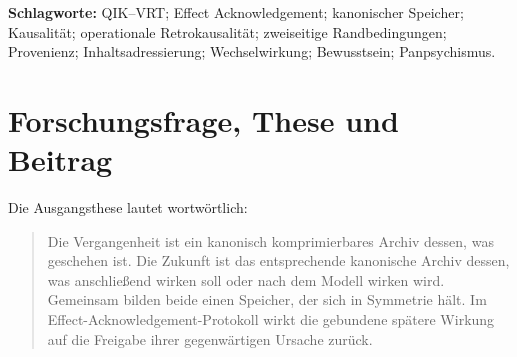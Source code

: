 \documentclass[11pt,a4paper]{article}
\theoremstyle{remark}
\begin{document}
\begin{otherlanguage}{english}
\begin{abstract}
This paper formalizes Ingolf Lohmann's thesis of a canonical memory that binds
past and future in a symmetric representational form.  The past is a
canonical, provenance-bearing archive of realized records; the future is a
canonical, provenance-bearing archive of anticipated or required later
effects.  Both use the same finite codec while retaining distinct epistemic
statuses: \emph{observed} and \emph{anticipated}.  QIK--VRT Effect
Acknowledgement joins them through a DONE-only release rule: a present cause
may become effective only if its future-indexed effect is explicitly bound,
validated, and acknowledged.

This is termed operational protocol retrocausality by the author in the
precisely defined protocol sense: a presently available representation of a
later effect is a non-eliminable, counterfactually relevant input to an earlier
release decision.  A Lean 4 model checks, as definitional and conformance
invariants, the necessary
past and future conditions, the counterfactual relevance of the future
boundary, non-overwrite of the past projection, and reciprocal closure between
a bound cause and an observed effect.  No physical signal from an already
actual future and no rewriting of a recorded past is inferred.  Provenance,
content addressing, forecasting, information thermodynamics, time-symmetric
quantum formalisms, and delayed-choice experiments are used as adjoining
theories with explicit limits.  A panpsychist reading is stated separately as
an ontological interpretation, not as an empirical consequence.
\end{abstract}
\end{otherlanguage}

\textbf{Schlagworte:} QIK--VRT; Effect Acknowledgement; kanonischer Speicher;
Kausalität; operationale Retrokausalität; zweiseitige Randbedingungen;
Provenienz; Inhaltsadressierung; Wechselwirkung; Bewusstsein; Panpsychismus.

\tableofcontents
\newpage

\section{Forschungsfrage, These und Beitrag}

Die Ausgangsthese lautet wortwörtlich:

\begin{quote}
Die Vergangenheit ist ein kanonisch komprimierbares Archiv dessen, was
geschehen ist. Die Zukunft ist das entsprechende kanonische Archiv dessen,
was anschließend wirken soll oder nach dem Modell wirken wird. Gemeinsam
bilden beide einen Speicher, der sich in Symmetrie hält. Im
Effect-Acknowledgement-Protokoll wirkt die gebundene spätere Wirkung auf die
Freigabe ihrer gegenwärtigen Ursache zurück.
\end{quote}
\end{document}
